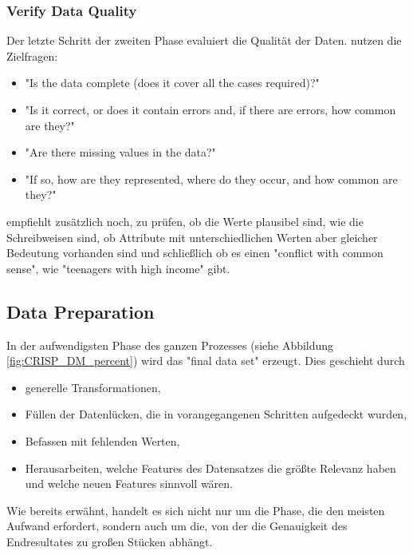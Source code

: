 \subsubsection{Verify Data Quality}
Der letzte Schritt der zweiten Phase evaluiert die Qualität der Daten. \citep[S.19]{chapman_crisp-dm_2000} nutzen die Zielfragen: 
\begin{itemize}
\item "Is the data complete (does it cover all the cases required)?"
\item "Is it correct, or does it contain errors and, if there are errors, how common are they?"
\item "Are there missing values in the data?"
\item "If so, how are they represented, where do they occur, and how common
are they?"
\end{itemize}
\citep[S.~16]{shearer_crisp-dm_2000} empfiehlt zusätzlich noch, zu prüfen, ob die Werte plausibel sind, wie die Schreibweisen sind, ob Attribute mit unterschiedlichen Werten aber gleicher Bedeutung vorhanden sind und schließlich ob es einen "conflict with common sense", wie "teenagers with high income"\citep[S.~16]{shearer_crisp-dm_2000} gibt. 
\subsection{Data Preparation}\label{subsubsec:DataPreperation}
In der aufwendigsten Phase des ganzen Prozesses (siehe Abbildung \ref{fig:CRISP_DM_percent}) wird das "final data set" erzeugt. Dies geschieht durch\citep[S.~73]{swamynathan_mastering_2017}
\begin{itemize}
\item generelle Transformationen,
\item Füllen der Datenlücken, die in vorangegangenen Schritten aufgedeckt wurden,
\item Befassen mit fehlenden Werten,
\item Herausarbeiten, welche Features des Datensatzes die größte Relevanz haben und welche neuen Features sinnvoll wären.
\end{itemize}
Wie bereits erwähnt, handelt es sich nicht nur um die Phase, die den meisten Aufwand erfordert, sondern auch um die, von der die Genauigkeit des Endresultates zu großen Stücken abhängt.\citep[S.~73]{swamynathan_mastering_2017}

